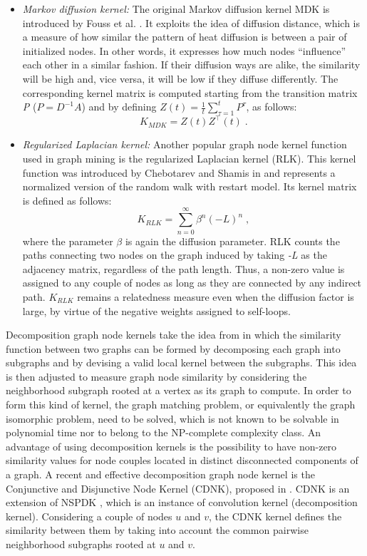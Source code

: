 \begin{itemize}
\item \textit{Markov diffusion kernel:} The original Markov diffusion kernel MDK is introduced by Fouss et al. \cite{jour3}. It exploits the idea of diffusion distance, which is a measure of how similar the pattern of heat diffusion is between a pair of initialized nodes. In other words, it expresses how much nodes ``influence'' each other in a similar fashion. If their diffusion ways are alike, the similarity will be high and, vice versa, it will be low if they diffuse differently. The corresponding kernel matrix is computed starting from the transition matrix \textit{P} ($P = D^{-1} A$) and by defining $Z(t) = \frac{1}{t}\sum_{\tau=1}^{t} P^{\tau}$, as follows:
\begin{equation}
K_{MDK} = Z(t) Z^{\top}(t)\; .
\end{equation}

\item \textit{Regularized Laplacian kernel:} Another popular graph node kernel function used in graph mining is the regularized Laplacian kernel (RLK). This kernel function was introduced by Chebotarev and Shamis in \cite{proceeding4} and represents a normalized version of the random walk with restart model. Its kernel matrix is defined as follows:
\begin{equation}
K_{RLK} = \sum_{n=0}^{\infty}\beta^{n}(-L)^n\; ,
\end{equation}
where the parameter $\beta$ is again the diffusion parameter. RLK counts the paths connecting two nodes on the graph induced by taking \textit{-L} as the adjacency matrix, regardless of the path length. Thus, a non-zero value is assigned to any couple of nodes as long as they are connected by any indirect path. $K_{RLK}$ remains a relatedness measure even when the diffusion factor is large, by virtue of the negative weights assigned to self-loops.
\end{itemize}
Decomposition graph node kernels take the idea from \cite{proceeding5} in which the similarity function between two graphs can be formed by decomposing each graph into subgraphs and by devising a valid local kernel between the subgraphs. This idea is then adjusted to measure graph node similarity by considering the neighborhood subgraph rooted at a vertex as its graph to compute. In order to form this kind of kernel,  the graph matching problem, or equivalently the graph isomorphic problem, need to be solved, which is not known to be solvable in polynomial time nor to belong to the NP-complete complexity class. An advantage of using decomposition kernels is the possibility to have non-zero similarity values for node couples located in distinct disconnected components of a graph. A recent and effective decomposition graph node kernel is the Conjunctive and Disjunctive Node Kernel (CDNK), proposed in \cite{proceeding6}. CDNK is an extension of NSPDK \cite{proceeding7}, which is an instance of convolution kernel (decomposition kernel). Considering a couple of nodes $u$ and $v$, the CDNK kernel defines the similarity between them by taking into account the common pairwise neighborhood subgraphs rooted at $u$ and $v$.
